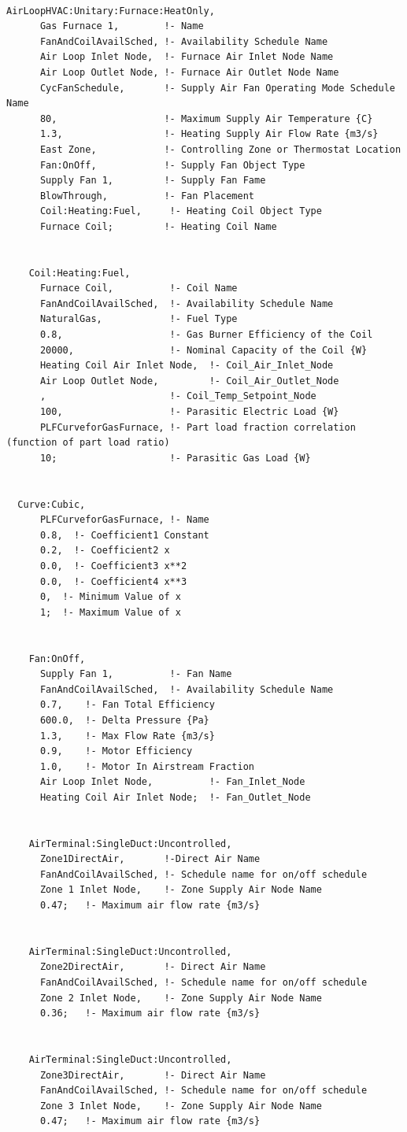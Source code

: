 \begin{lstlisting}

AirLoopHVAC:Unitary:Furnace:HeatOnly,
      Gas Furnace 1,        !- Name
      FanAndCoilAvailSched, !- Availability Schedule Name
      Air Loop Inlet Node,  !- Furnace Air Inlet Node Name
      Air Loop Outlet Node, !- Furnace Air Outlet Node Name
      CycFanSchedule,       !- Supply Air Fan Operating Mode Schedule Name
      80,                   !- Maximum Supply Air Temperature {C}
      1.3,                  !- Heating Supply Air Flow Rate {m3/s}
      East Zone,            !- Controlling Zone or Thermostat Location
      Fan:OnOff,            !- Supply Fan Object Type
      Supply Fan 1,         !- Supply Fan Fame
      BlowThrough,          !- Fan Placement
      Coil:Heating:Fuel,     !- Heating Coil Object Type
      Furnace Coil;         !- Heating Coil Name


    Coil:Heating:Fuel,
      Furnace Coil,          !- Coil Name
      FanAndCoilAvailSched,  !- Availability Schedule Name
      NaturalGas,            !- Fuel Type
      0.8,                   !- Gas Burner Efficiency of the Coil
      20000,                 !- Nominal Capacity of the Coil {W}
      Heating Coil Air Inlet Node,  !- Coil_Air_Inlet_Node
      Air Loop Outlet Node,         !- Coil_Air_Outlet_Node
      ,                      !- Coil_Temp_Setpoint_Node
      100,                   !- Parasitic Electric Load {W}
      PLFCurveforGasFurnace, !- Part load fraction correlation (function of part load ratio)
      10;                    !- Parasitic Gas Load {W}


  Curve:Cubic,
      PLFCurveforGasFurnace, !- Name
      0.8,  !- Coefficient1 Constant
      0.2,  !- Coefficient2 x
      0.0,  !- Coefficient3 x**2
      0.0,  !- Coefficient4 x**3
      0,  !- Minimum Value of x
      1;  !- Maximum Value of x


    Fan:OnOff,
      Supply Fan 1,          !- Fan Name
      FanAndCoilAvailSched,  !- Availability Schedule Name
      0.7,    !- Fan Total Efficiency
      600.0,  !- Delta Pressure {Pa}
      1.3,    !- Max Flow Rate {m3/s}
      0.9,    !- Motor Efficiency
      1.0,    !- Motor In Airstream Fraction
      Air Loop Inlet Node,          !- Fan_Inlet_Node
      Heating Coil Air Inlet Node;  !- Fan_Outlet_Node


    AirTerminal:SingleDuct:Uncontrolled,
      Zone1DirectAir,       !-Direct Air Name
      FanAndCoilAvailSched, !- Schedule name for on/off schedule
      Zone 1 Inlet Node,    !- Zone Supply Air Node Name
      0.47;   !- Maximum air flow rate {m3/s}


    AirTerminal:SingleDuct:Uncontrolled,
      Zone2DirectAir,       !- Direct Air Name
      FanAndCoilAvailSched, !- Schedule name for on/off schedule
      Zone 2 Inlet Node,    !- Zone Supply Air Node Name
      0.36;   !- Maximum air flow rate {m3/s}


    AirTerminal:SingleDuct:Uncontrolled,
      Zone3DirectAir,       !- Direct Air Name
      FanAndCoilAvailSched, !- Schedule name for on/off schedule
      Zone 3 Inlet Node,    !- Zone Supply Air Node Name
      0.47;   !- Maximum air flow rate {m3/s}
\end{lstlisting}

